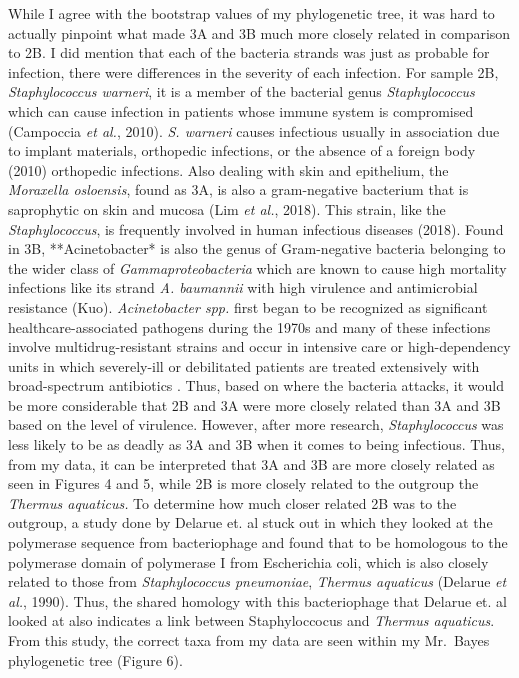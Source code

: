 \documentclass[]{article}
\begin{document}
While I agree with the bootstrap values of my phylogenetic tree, it was
hard to actually pinpoint what made 3A and 3B much more closely related
in comparison to 2B. I did mention that each of the bacteria strands was
just as probable for infection, there were differences in the severity
of each infection. For sample 2B, \emph{Staphylococcus warneri}, it is a
member of the bacterial genus \emph{Staphylococcus} which can cause
infection in patients whose immune system is compromised (Campoccia
\emph{et al.}, 2010). \emph{S. warneri} causes infectious usually in
association due to implant materials, orthopedic infections, or the
absence of a foreign body (2010) orthopedic infections. Also dealing
with skin and epithelium, the \emph{Moraxella osloensis}, found as 3A,
is also a gram-negative bacterium that is saprophytic on skin and mucosa
(Lim \emph{et al.}, 2018). This strain, like the \emph{Staphylococcus},
is frequently involved in human infectious diseases (2018). Found in 3B,
**Acinetobacter* is also the genus of Gram-negative bacteria belonging
to the wider class of \emph{Gammaproteobacteria} which are known to
cause high mortality infections like its strand \emph{A. baumannii} with
high virulence and antimicrobial resistance (Kuo). \emph{Acinetobacter
spp.} first began to be recognized as significant healthcare-associated
pathogens during the 1970s and many of these infections involve
multidrug-resistant strains and occur in intensive care or
high-dependency units in which severely-ill or debilitated patients are
treated extensively with broad-spectrum antibiotics . Thus, based on
where the bacteria attacks, it would be more considerable that 2B and 3A
were more closely related than 3A and 3B based on the level of
virulence. However, after more research, \emph{Staphylococcus} was less
likely to be as deadly as 3A and 3B when it comes to being infectious.
Thus, from my data, it can be interpreted that 3A and 3B are more
closely related as seen in Figures 4 and 5, while 2B is more closely
related to the outgroup the \emph{Thermus aquaticus.} To determine how
much closer related 2B was to the outgroup, a study done by Delarue et.
al stuck out in which they looked at the polymerase sequence from
bacteriophage and found that to be homologous to the polymerase domain
of polymerase I from Escherichia coli, which is also closely related to
those from \emph{Staphylococcus pneumoniae}, \emph{Thermus aquaticus}
(Delarue \emph{et al.}, 1990). Thus, the shared homology with this
bacteriophage that Delarue et. al looked at also indicates a link
between Staphyloccocus and \emph{Thermus aquaticus}. From this study,
the correct taxa from my data are seen within my Mr.~Bayes phylogenetic
tree (Figure 6).
\end{document}
